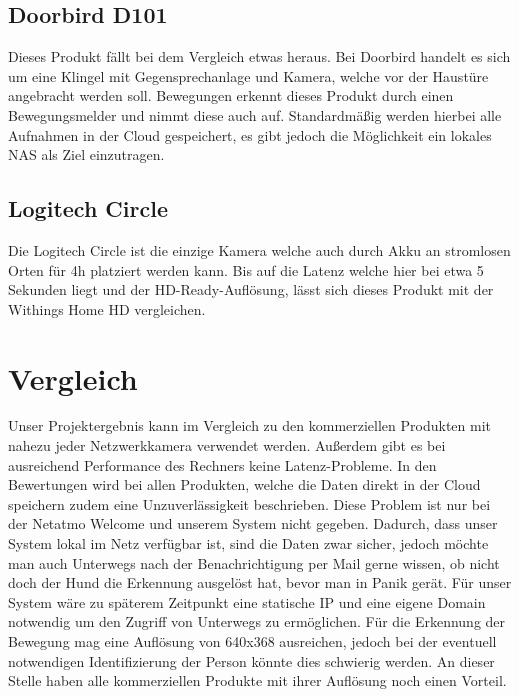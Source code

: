 \subsection{Doorbird D101}
Dieses Produkt fällt bei dem Vergleich etwas heraus. Bei Doorbird handelt es sich um eine Klingel mit Gegensprechanlage und Kamera, welche vor der Haustüre angebracht werden soll. Bewegungen erkennt dieses Produkt durch einen Bewegungsmelder und nimmt diese auch auf. Standardmäßig werden hierbei alle Aufnahmen in der Cloud gespeichert, es gibt jedoch die Möglichkeit ein lokales NAS als Ziel einzutragen.

\subsection{Logitech Circle}
Die Logitech Circle ist die einzige Kamera welche auch durch Akku an stromlosen Orten für 4h platziert werden kann. Bis auf die Latenz welche hier bei etwa 5 Sekunden liegt und der HD-Ready-Auflösung, lässt sich dieses Produkt mit der Withings Home HD vergleichen. 

\section{Vergleich}
Unser Projektergebnis kann im Vergleich zu den kommerziellen Produkten mit nahezu jeder Netzwerkkamera verwendet werden. Außerdem gibt es bei ausreichend Performance des Rechners keine Latenz-Probleme. In den Bewertungen wird bei allen Produkten, welche die Daten direkt in der Cloud speichern zudem eine Unzuverlässigkeit beschrieben. Diese Problem ist nur bei der Netatmo Welcome und unserem System nicht gegeben. Dadurch, dass unser System lokal im Netz verfügbar ist, sind die Daten zwar sicher, jedoch möchte man auch Unterwegs nach der Benachrichtigung per Mail gerne wissen, ob nicht doch der Hund die Erkennung ausgelöst hat, bevor man in Panik gerät. Für unser System wäre zu späterem Zeitpunkt eine statische IP und eine eigene Domain notwendig um den Zugriff von Unterwegs zu ermöglichen. Für die Erkennung der Bewegung mag eine Auflösung von 640x368 ausreichen, jedoch bei der eventuell notwendigen Identifizierung der Person könnte dies schwierig werden. An dieser Stelle haben alle kommerziellen Produkte mit ihrer Auflösung noch einen Vorteil.